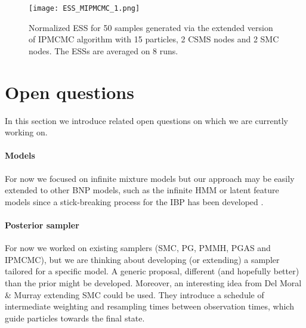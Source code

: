 \begin{figure}[h!]
\centering
\texttt{[image: ESS\_MIPMCMC\_1.png]}
    \caption{Normalized \acrfull{ESS} for 50 samples generated via the extended version of IPMCMC algorithm with 15 particles, 2 CSMS nodes and 2 SMC nodes. The \gls{ESS}s are averaged on 8 runs.}
    \label{fig:ESS_MIPMCMC}
\end{figure}

\section{Open questions}
In this section we introduce related open questions on which we are currently working on.


\paragraph{Models}
For now we focused on infinite mixture models but our approach may be easily extended to other \gls{BNP} models, such as the infinite \acrlong{HMM} \cite{Beal02theinfinite} or latent feature models \cite{Ghahramani:2006tp} since a stick-breaking process for the \acrlong{IBP} has been developed \cite{stick-breaking-ibp}.

\paragraph{Posterior sampler}
For now we worked on existing samplers (\gls{SMC}, \gls{PG}, \gls{PMMH}, \gls{PGAS} and \gls{IPMCMC}), but we are thinking about developing (or extending) a sampler tailored for a specific model. A generic proposal, different (and hopefully better) than the prior might be developed.
Moreover, an interesting idea from Del Moral \& Murray \cite{DelMoral:2015jk} extending \gls{SMC} could be used. They introduce a schedule of intermediate weighting and resampling times between observation times, which guide particles towards the final state.
